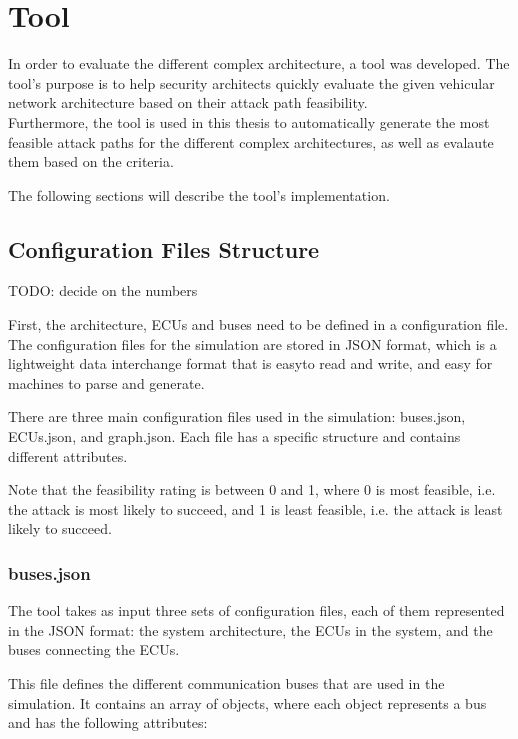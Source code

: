\chapter{Tool}
\label{chp:tool}

In order to evaluate the different complex architecture, a tool was developed.
The tool's purpose is to help security architects quickly evaluate the given vehicular network architecture based on their \gls{attack path} feasibility.\\
Furthermore, the tool is used in this thesis to automatically generate the most feasible attack paths for the different complex architectures, 
as well as evalaute them based on the criteria.

The following sections will describe the tool's implementation.

\section{Configuration Files Structure}
\label{sec:config}

TODO: decide on the numbers

First, the architecture, ECUs and buses need to be defined in a configuration file.
The configuration files for the simulation are stored in JSON format, which is a lightweight data interchange format that is easyto read and write, and easy for machines to parse and generate.

There are three main configuration files used in the simulation: buses.json, ECUs.json, and graph.json.
Each file has a specific structure and contains different attributes.

Note that the feasibility rating is between 0 and 1, where 0 is most feasible, i.e. the attack is most likely to succeed, and 1 is least feasible, i.e. the attack is least likely to succeed.

\subsection{buses.json}
\label{sec:buses}

The tool takes as input three sets of configuration files, each of them represented in the JSON format: 
the system architecture, the ECUs in the system, and the buses connecting the ECUs. 

This file defines the different communication buses that are used in the simulation. 
It contains an array of objects, where each object represents a bus and has the following attributes:

